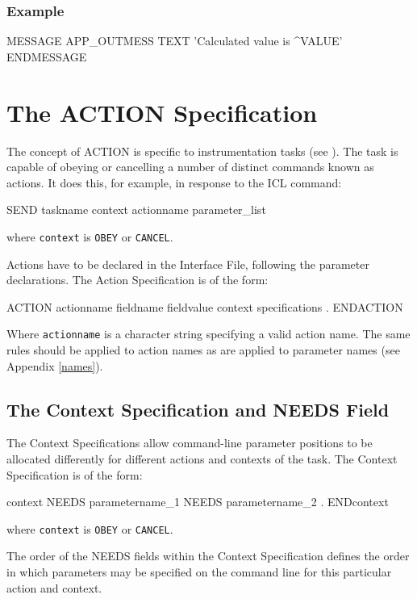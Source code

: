 \documentclass[twoside,11pt,nolof]{starlink}
\begin{document}
\subsubsection*{Example}
\begin{terminalv}
MESSAGE APP_OUTMESS
   TEXT 'Calculated value is ^VALUE'
ENDMESSAGE
\end{terminalv}

\section{The ACTION Specification
\label{action}}

The concept of ACTION is specific to instrumentation tasks (see
).
The task is capable of obeying or cancelling a number of distinct commands
known as actions.
It does this, for example, in response to the ICL command:
\begin{terminalv}
SEND taskname context actionname parameter_list
\end{terminalv}
where \texttt{context} is \texttt{OBEY} or \texttt{CANCEL}.

Actions have to be declared in the Interface File, following the parameter
declarations. The Action Specification is of the form:
\begin{terminalv}
ACTION actionname
   fieldname fieldvalue
   context specifications
      .
ENDACTION
\end{terminalv}
Where \texttt{actionname} is a character string specifying a valid action name.
The same rules should be applied to action names as are applied to parameter
names (see Appendix \ref{names}).

\subsection{The Context Specification and NEEDS Field
\label{needs}}

The Context Specifications allow command-line parameter positions to be
allocated differently for different actions and contexts of the task.
The Context Specification is of the form:
\begin{terminalv}
   context
      NEEDS parametername_1
      NEEDS parametername_2
       .
   ENDcontext
\end{terminalv}
where \texttt{context} is \texttt{OBEY} or \texttt{CANCEL}.

The order of the NEEDS fields within the Context Specification defines
the order in which parameters may be specified on the command line
for this particular action and context.
\end{document}
